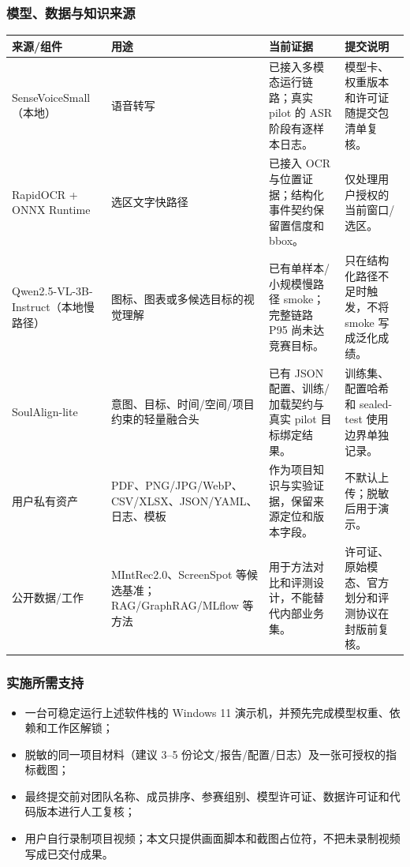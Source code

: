 \documentclass[UTF8,12pt]{ctexart}
\begin{document}
\subsubsection{模型、数据与知识来源}
\begin{center}
\scriptsize
\begin{tabularx}{\textwidth}{>{\raggedright\arraybackslash}p{}
  >{\raggedright\arraybackslash}p{}
  >{\raggedright\arraybackslash}p{}X}
\toprule
来源/组件 & 用途 & 当前证据 & 提交说明\\
\midrule
SenseVoiceSmall（本地） & 语音转写 & 已接入多模态运行链路；真实 pilot 的 ASR 阶段有逐样本日志。 & 模型卡、权重版本和许可证随提交包清单复核。\\
RapidOCR + ONNX Runtime & 选区文字快路径 & 已接入 OCR 与位置证据；结构化事件契约保留置信度和 bbox。 & 仅处理用户授权的当前窗口/选区。\\
Qwen2.5-VL-3B-Instruct（本地慢路径） & 图标、图表或多候选目标的视觉理解 & 已有单样本/小规模慢路径 smoke；完整链路 P95 尚未达竞赛目标。 & 只在结构化路径不足时触发，不将 smoke 写成泛化成绩。\\
SoulAlign-lite & 意图、目标、时间/空间/项目约束的轻量融合头 & 已有 JSON 配置、训练/加载契约与真实 pilot 目标绑定结果。 & 训练集、配置哈希和 sealed-test 使用边界单独记录。\\
用户私有资产 & PDF、PNG/JPG/WebP、CSV/XLSX、JSON/YAML、日志、模板 & 作为项目知识与实验证据，保留来源定位和版本字段。 & 不默认上传；脱敏后用于演示。\\
公开数据/工作 & MIntRec2.0、ScreenSpot 等候选基准；RAG/GraphRAG/MLflow 等方法 & 用于方法对比和评测设计，不能替代内部业务集。 & 许可证、原始模态、官方划分和评测协议在封版前复核。\\
\bottomrule
\end{tabularx}
\end{center}

\subsubsection{实施所需支持}
\begin{itemize}
  \item 一台可稳定运行上述软件栈的 Windows 11 演示机，并预先完成模型权重、依赖和工作区解锁；
  \item 脱敏的同一项目材料（建议 3--5 份论文/报告/配置/日志）及一张可授权的指标截图；
  \item 最终提交前对团队名称、成员排序、参赛组别、模型许可证、数据许可证和代码版本进行人工复核；
  \item 用户自行录制项目视频；本文只提供画面脚本和截图占位符，不把未录制视频写成已交付成果。
\end{itemize}
\end{document}
